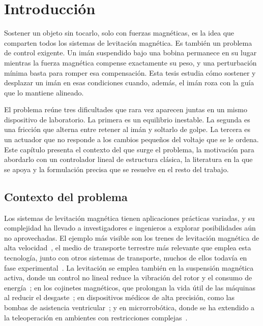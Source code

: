 \chapter{Introducción}\label{chap:introduccion}

Sostener un objeto sin tocarlo, solo con fuerzas magnéticas, es la idea que comparten todos los sistemas de levitación magnética. Es también un problema de control exigente. Un imán suspendido bajo una bobina permanece en su lugar mientras la fuerza magnética compense exactamente su peso, y una perturbación mínima basta para romper esa compensación. Esta tesis estudia cómo sostener y desplazar un imán en esas condiciones cuando, además, el imán roza con la guía que lo mantiene alineado.

El problema reúne tres dificultades que rara vez aparecen juntas en un mismo dispositivo de laboratorio. La primera es un equilibrio inestable. La segunda es una fricción que alterna entre retener al imán y soltarlo de golpe. La tercera es un actuador que no responde a los cambios pequeños del voltaje que se le ordena. Este capítulo presenta el contexto del que surge el problema, la motivación para abordarlo con un controlador lineal de estructura clásica, la literatura en la que se apoya y la formulación precisa que se resuelve en el resto del trabajo.

\section{Contexto del problema}

Los sistemas de levitación magnética tienen aplicaciones prácticas variadas, y su complejidad ha llevado a investigadores e ingenieros a explorar posibilidades aún no aprovechadas. El ejemplo más visible son los trenes de levitación magnética de alta velocidad~\cite{mingda}, el medio de transporte terrestre más relevante que emplea esta tecnología, junto con otros sistemas de transporte, muchos de ellos todavía en fase experimental~\cite{hyung}. La levitación se emplea también en la suspensión magnética activa, donde un control no lineal reduce la vibración del rotor y el consumo de energía~\cite{charara}; en los cojinetes magnéticos, que prolongan la vida útil de las máquinas al reducir el desgaste~\cite{debarghya}; en dispositivos médicos de alta precisión, como las bombas de asistencia ventricular~\cite{gang1}; y en microrrobótica, donde se ha extendido a la teleoperación en ambientes con restricciones complejas~\cite{mir}.

